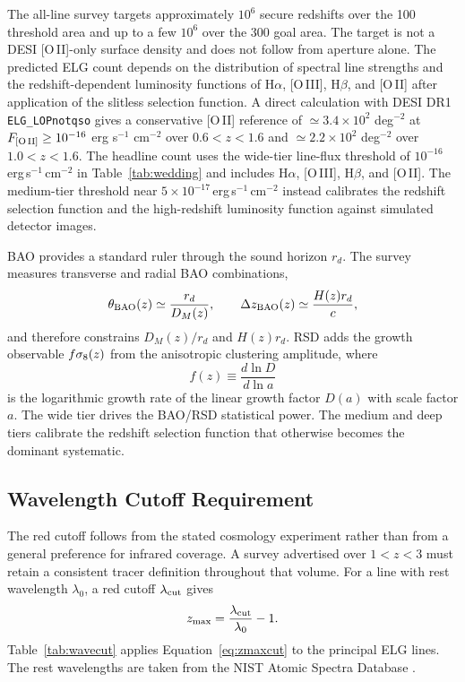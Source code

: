 The all-line survey targets approximately $10^6$ secure redshifts over the 100 \degti threshold area and up to a few $10^6$ over the 300 \degti goal area. The target is not a DESI [O\,II]-only surface density and does not follow from aperture alone. The predicted ELG count depends on the distribution of spectral line strengths and the redshift-dependent luminosity functions of H$\alpha$, [O\,III], H$\beta$, and [O\,II] after application of the slitless selection function. A direct calculation with DESI DR1 \texttt{ELG\_LOPnotqso} gives a conservative [O\,II] reference of $\simeq3.4\times10^2$ deg$^{-2}$ at $F_{\rm [O\,II]}\ge10^{-16}$ erg s$^{-1}$ cm$^{-2}$ over $0.6<z<1.6$ and $\simeq2.2\times10^2$ deg$^{-2}$ over $1.0<z<1.6$. The headline count uses the wide-tier line-flux threshold of $10^{-16}$\,erg\,s$^{-1}$\,cm$^{-2}$ in Table~\ref{tab:wedding} and includes H$\alpha$, [O\,III], H$\beta$, and [O\,II]. The medium-tier threshold near $5\times10^{-17}$\,erg\,s$^{-1}$\,cm$^{-2}$ instead calibrates the redshift selection function and the high-redshift luminosity function against simulated detector images.

BAO provides a standard ruler through the sound horizon $r_d$. The survey measures transverse and radial BAO combinations,
\begin{equation}
  \theta_{\rm BAO}(z)\simeq \frac{r_d}{D_M(z)}, \qquad
  \Delta z_{\rm BAO}(z)\simeq \frac{H(z)r_d}{c},
\end{equation}
and therefore constrains $D_M(z)/r_d$ and $H(z)r_d$. RSD adds the growth observable $f\sigma_8(z)$ from the anisotropic clustering amplitude, where
\begin{equation}
  f(z)\equiv\frac{d\ln D}{d\ln a}
\end{equation}
is the logarithmic growth rate of the linear growth factor $D(a)$ with scale factor $a$. The wide tier drives the BAO/RSD statistical power. The medium and deep tiers calibrate the redshift selection function that otherwise becomes the dominant systematic.

\subsection{Wavelength Cutoff Requirement}\label{sec:wavecut}

The red cutoff follows from the stated cosmology experiment rather than from a general preference for infrared coverage. A survey advertised over $1<z<3$ must retain a consistent tracer definition throughout that volume. For a line with rest wavelength $\lambda_0$, a red cutoff $\lambda_{\rm cut}$ gives
\begin{equation}
  z_{\max}=\frac{\lambda_{\rm cut}}{\lambda_0}-1.
  \label{eq:zmaxcut}
\end{equation}
Table~\ref{tab:wavecut} applies Equation~\eqref{eq:zmaxcut} to the principal ELG lines. The rest wavelengths are taken from the NIST Atomic Spectra Database \cite{nistlines}.

